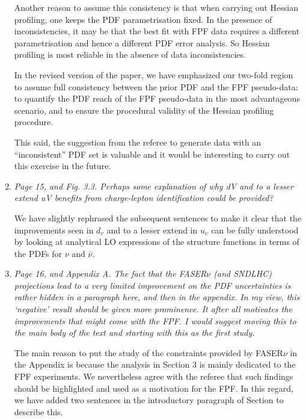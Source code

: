 \documentclass[11pt,a4paper]{article}
\begin{document}
\begin{enumerate}
          Another reason to assume this consistency  is that when carrying out Hessian profiling,
          one keeps the PDF parametrisation fixed. In the presence of inconsistencies, it may be
          that the best fit with FPF data requires a different parametrisation and hence
          a different PDF error analysis.
          So Hessian profiling is most reliable in the absence of data inconsistencies.

          In the revised version of the paper, we have emphasized our two-fold region
          to assume full consistency between the prior PDF and the FPF pseudo-data: to
          quantify the PDF reach of the FPF pseudo-data in the most advantageous scenario,
          and to ensure the procedural validity of the Hessian profiling procedure.

          This said, the suggestion from the referee to generate data with an ``inconsistent'' PDF
          set is valuable and it would be interesting to carry out this exercise in the future.
          
	\item {\it Page 15, and Fig. 3.3. Perhaps some explanation of why dV and to a lesser extend uV
		benefits from charge-lepton identification could be provided?
	}
	
	We have slightly rephrased the subsequent sentences to make it clear that the improvements
	seen in $d_v$ and to a lesser extend in $u_v$ can be fully understood by looking at analytical 
	LO expressions of the structure functions in terms of the PDFs for $\nu$ and $\bar{\nu}$.
	
	\item {\it Page 16, and Appendix A. The fact that the FASER$\nu$ (and SNDLHC) projections lead
		to a very limited improvement on the PDF uncertainties is rather hidden in a paragraph
		here, and then in the appendix. In my view, this ‘negative’ result should be given more
		prominence. It after all motivates the improvements that might come with the FPF. I
		would suggest moving this to the main body of the text and starting with this as the
		first study.
	}
	
	The main reason to put the study of the constraints provided by FASER$\nu$ in the Appendix is because
	the analysis in Section 3 is mainly dedicated to the FPF experiments. We nevertheless agree with the
	referee that such findings should be highlighted and used as a motivation for the FPF. In this regard, we
	have added two sentences in the introductory paragraph of Section to describe this.
	

\end{enumerate}
\end{document}
